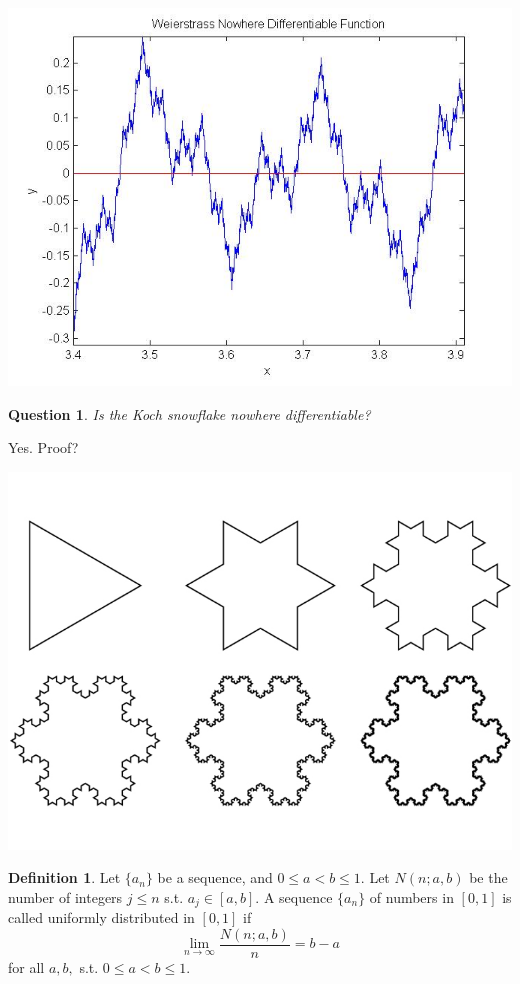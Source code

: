 \documentclass[12pt]{article}
\theoremstyle{plain}
\newtheorem{question}[theorem]{Question}
\theoremstyle{definition}
\newtheorem{definition}[theorem]{Definition}
\theoremstyle{remark}
\begin{document}
\centerline{\includegraphics[width=1.0\textwidth]{nodiff1}}

\begin{question}
Is the Koch snowflake nowhere differentiable?
\end{question}

Yes. Proof?

\centerline{\includegraphics[width=1.0\textwidth]{biomimicry-koch-snowflake}}

\begin{definition}
Let $\{a_n\}$ be a sequence, and $0 \leq a < b \leq 1$. Let $N(n; a, b)$ be the number of integers $j \leq n$ s.t. $a_j \in [a, b].$ A sequence $\{a_n\}$ of numbers in $[0, 1]$ is called uniformly distributed in $[0, 1]$ if $$\lim_{n \to \infty} \frac{N(n; a, b)}{n} = b - a$$ for all $a, b,$ s.t. $0 \leq a < b \leq 1.$
\end{definition}
\end{document}
